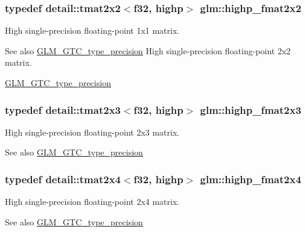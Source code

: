 \subsubsection[{\texorpdfstring{highp\+\_\+fmat2x2}{highp_fmat2x2}}]{\setlength{\rightskip}{0pt plus 5cm}typedef detail\+::tmat2x2$<$f32, highp$>$ {\bf glm\+::highp\+\_\+fmat2x2}}\hypertarget{group__gtc__type__precision_gaeb76f1230ecfd4c80635d3c618405e31}{}\label{group__gtc__type__precision_gaeb76f1230ecfd4c80635d3c618405e31}
High single-\/precision floating-\/point 1x1 matrix. \begin{DoxySeeAlso}{See also}
\hyperlink{group__gtc__type__precision}{G\+L\+M\+\_\+\+G\+T\+C\+\_\+type\+\_\+precision} High single-\/precision floating-\/point 2x2 matrix. 

\hyperlink{group__gtc__type__precision}{G\+L\+M\+\_\+\+G\+T\+C\+\_\+type\+\_\+precision} 
\end{DoxySeeAlso}
\subsubsection[{\texorpdfstring{highp\+\_\+fmat2x3}{highp_fmat2x3}}]{\setlength{\rightskip}{0pt plus 5cm}typedef detail\+::tmat2x3$<$f32, highp$>$ {\bf glm\+::highp\+\_\+fmat2x3}}\hypertarget{group__gtc__type__precision_ga53c126d1650b460bc7496a6fd5e5e764}{}\label{group__gtc__type__precision_ga53c126d1650b460bc7496a6fd5e5e764}
High single-\/precision floating-\/point 2x3 matrix. \begin{DoxySeeAlso}{See also}
\hyperlink{group__gtc__type__precision}{G\+L\+M\+\_\+\+G\+T\+C\+\_\+type\+\_\+precision} 
\end{DoxySeeAlso}
\subsubsection[{\texorpdfstring{highp\+\_\+fmat2x4}{highp_fmat2x4}}]{\setlength{\rightskip}{0pt plus 5cm}typedef detail\+::tmat2x4$<$f32, highp$>$ {\bf glm\+::highp\+\_\+fmat2x4}}\hypertarget{group__gtc__type__precision_ga5df8430c47272adc901ef224d85a9c4d}{}\label{group__gtc__type__precision_ga5df8430c47272adc901ef224d85a9c4d}
High single-\/precision floating-\/point 2x4 matrix. \begin{DoxySeeAlso}{See also}
\hyperlink{group__gtc__type__precision}{G\+L\+M\+\_\+\+G\+T\+C\+\_\+type\+\_\+precision} 
\end{DoxySeeAlso}

